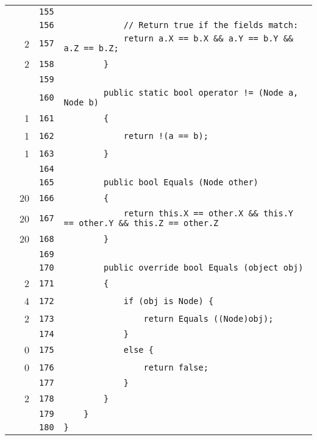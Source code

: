 \documentclass[a4paper,10pt]{article}
\begin{document}
\begin{longtable}[l]{lrrl}
\cellcolor{gray} &  & \verb~155~ & \verb~~\\
\cellcolor{gray} &  & \verb~156~ & \verb~            // Return true if the fields match:~\\
\cellcolor{green} & 2 & \verb~157~ & \verb~            return a.X == b.X && a.Y == b.Y && a.Z == b.Z;~\\
\cellcolor{green} & 2 & \verb~158~ & \verb~        }~\\
\cellcolor{gray} &  & \verb~159~ & \verb~~\\
\cellcolor{gray} &  & \verb~160~ & \verb~        public static bool operator != (Node a, Node b)~\\
\cellcolor{green} & 1 & \verb~161~ & \verb~        {~\\
\cellcolor{green} & 1 & \verb~162~ & \verb~            return !(a == b);~\\
\cellcolor{green} & 1 & \verb~163~ & \verb~        }~\\
\cellcolor{gray} &  & \verb~164~ & \verb~~\\
\cellcolor{gray} &  & \verb~165~ & \verb~        public bool Equals (Node other)~\\
\cellcolor{green} & 20 & \verb~166~ & \verb~        {~\\
\cellcolor{green} & 20 & \verb~167~ & \verb~            return this.X == other.X && this.Y == other.Y && this.Z == other.Z~\\
\cellcolor{green} & 20 & \verb~168~ & \verb~        }~\\
\cellcolor{gray} &  & \verb~169~ & \verb~~\\
\cellcolor{gray} &  & \verb~170~ & \verb~        public override bool Equals (object obj)~\\
\cellcolor{green} & 2 & \verb~171~ & \verb~        {~\\
\cellcolor{green} & 4 & \verb~172~ & \verb~            if (obj is Node) {~\\
\cellcolor{green} & 2 & \verb~173~ & \verb~                return Equals ((Node)obj);~\\
\cellcolor{gray} &  & \verb~174~ & \verb~            }~\\
\cellcolor{red} & 0 & \verb~175~ & \verb~            else {~\\
\cellcolor{red} & 0 & \verb~176~ & \verb~                return false;~\\
\cellcolor{gray} &  & \verb~177~ & \verb~            }~\\
\cellcolor{green} & 2 & \verb~178~ & \verb~        }~\\
\cellcolor{gray} &  & \verb~179~ & \verb~    }~\\
\cellcolor{gray} &  & \verb~180~ & \verb~}~\\
\end{longtable}
\newpage
\end{document}

